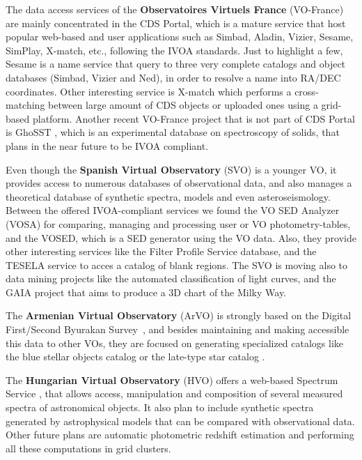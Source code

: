The data access services of the \textbf{Observatoires Virtuels France}
(VO-France) are mainly concentrated in the 
CDS Portal, which is a mature service that host popular web-based and
user applications such as Simbad, Aladin, Vizier, Sesame, SimPlay, X-match,
etc., following the IVOA standards. 
Just to highlight a few, Sesame is a name service that query to 
three very complete catalogs and object databases (Simbad, Vizier and Ned),
in order to resolve a name into RA/DEC coordinates. Other interesting 
service is X-match which performs a cross-matching between large amount
of CDS objects or uploaded ones using a grid-based platform.
Another recent VO-France project that is not part of CDS Portal 
is GhoSST \cite{},
which is an experimental database on spectroscopy of solids, that
plans in the near future to be IVOA compliant.

Even though the \textbf{Spanish Virtual Observatory} (SVO) is a younger VO, it
provides access to numerous databases of observational data, and also manages a
theoretical database of synthetic spectra, models and even asteroseismology.
Between the offered IVOA-compliant services we found the VO SED Analyzer (VOSA)
for comparing, managing and processing user or VO photometry-tables,
and the VOSED, which is a SED generator using the VO data.
Also, they provide other interesting services like the Filter Profile Service
database, and the TESELA service \cite{} to acces a catalog of blank regions.
The SVO is moving also to data mining projects like the automated classification
of light curves, and the GAIA project that aims to produce a 3D chart of the 
Milky Way. 


The \textbf{Armenian Virtual Observatory} (ArVO) is strongly based on the
Digital First/Second Byurakan Survey~\cite{}, 
and besides maintaining and making accessible this data to other VOs,
they are focused on generating specialized catalogs like the
blue stellar objects catalog or the late-type star catalog \cite{}.

The \textbf{Hungarian Virtual Observatory} (HVO) offers a web-based Spectrum
Service \cite{},
that allows access, manipulation and composition of
several measured spectra of astronomical objects. It
also plan to include synthetic spectra generated by
astrophysical models that can be compared with observational
data. Other future plans are automatic photometric redshift 
estimation and performing all these computations in grid clusters. 

